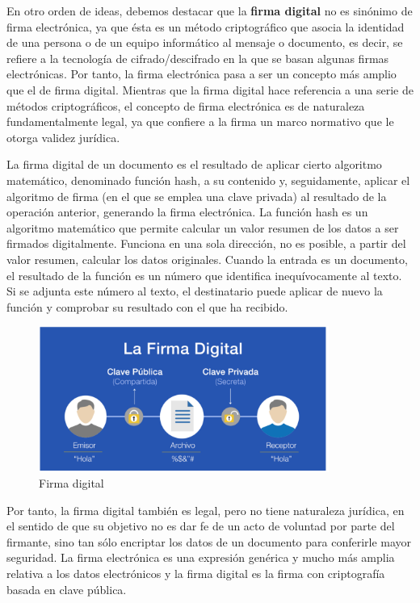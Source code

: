 \documentclass{manual}
\begin{document}
En otro orden de ideas, debemos destacar que la \textbf{firma digital} no es sinónimo de firma electrónica, ya que ésta es un método criptográfico que asocia la identidad de una persona o de un equipo informático al mensaje o documento, es decir, se refiere a la tecnología de cifrado/descifrado en la que se basan algunas firmas electrónicas. Por tanto, la firma electrónica pasa a ser un concepto más amplio que el de firma digital. Mientras que la firma digital hace referencia a una serie de métodos criptográficos, el concepto de firma electrónica es de naturaleza fundamentalmente legal, ya que confiere a la firma un marco normativo que le otorga validez jurídica. 


La firma digital de un documento es el resultado de aplicar cierto algoritmo matemático, denominado función hash, a su contenido y, seguidamente, aplicar el algoritmo de firma (en el que se emplea una clave privada) al resultado de la operación anterior, generando la firma electrónica. La función hash es un algoritmo matemático que permite calcular un valor resumen de los datos a ser firmados digitalmente. Funciona en una sola dirección, no es posible, a partir del valor resumen, calcular los datos originales. Cuando la entrada es un documento, el resultado de la función es un número que identifica inequívocamente al texto. Si se adjunta este número al texto, el destinatario puede aplicar de nuevo la función y comprobar su resultado con el que ha recibido. 

\begin{figure}[H]
	\centering
	\includegraphics[width=95mm]{images/firma}
	\caption{Firma digital} 
\end{figure}

Por tanto, la firma digital también es legal, pero no tiene naturaleza jurídica, en el sentido de que su objetivo no es dar fe de un acto de voluntad por parte del firmante, sino tan sólo encriptar los datos de un documento para conferirle mayor seguridad. La firma electrónica es una expresión genérica y mucho más amplia relativa a los datos electrónicos y la firma digital es la firma con criptografía basada en clave pública.
\end{document}
